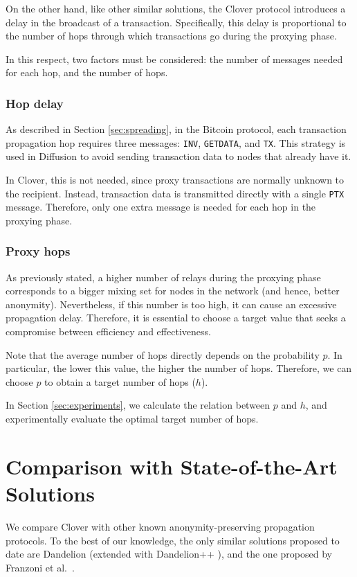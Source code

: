 \documentclass{article}
\begin{document}
	On the other hand, like other similar solutions, the Clover protocol introduces a delay in the broadcast of a transaction.
	Specifically, this delay is proportional to the number of hops through which transactions go during the proxying phase.
	
	In this respect, two factors must be considered: the number of messages needed for each hop, and the number of hops.
	
	\subsubsection{Hop delay}
	As described in Section \ref{sec:spreading}, in the Bitcoin protocol, each transaction propagation hop requires three messages: \texttt{INV}, \texttt{GETDATA}, and \texttt{TX}.
	This strategy is used in Diffusion to avoid sending transaction data to nodes that already have it.
	
	In Clover, this is not needed, since proxy transactions are normally unknown to the recipient.
	Instead, transaction data is transmitted directly with a single \texttt{PTX} message.
	Therefore, only one extra message is needed for each hop in the proxying phase.
	
	\subsubsection{Proxy hops}
	As previously stated, a higher number of relays during the proxying phase corresponds to a bigger mixing set for nodes in the network (and hence, better anonymity).
	Nevertheless, if this number is too high, it can cause an excessive propagation delay.
	Therefore, it is essential to choose a target value that seeks a compromise between efficiency and effectiveness.
	
	Note that the average number of hops directly depends on the probability $p$.
	In particular, the lower this value, the higher the number of hops.
	Therefore, we can choose $p$ to obtain a target number of hops ($h$).
	
	In Section \ref{sec:experiments}, we calculate the relation between $p$ and $h$, and experimentally evaluate the optimal target number of hops.
	
	
	\section{Comparison with State-of-the-Art Solutions}
	We compare Clover with other known anonymity-preserving propagation protocols.
	To the best of our knowledge, the only similar solutions proposed to date are Dandelion \cite{venkatakrishnan2017dandelion} (extended with Dandelion++ \cite{fanti2018dandelion++}), and the one proposed by Franzoni et al.~\cite{franzoni2020improving}.
	
\end{document}
